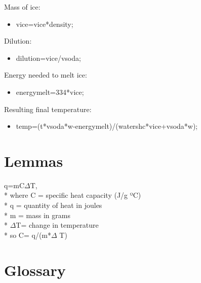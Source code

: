 \documentclass[oneside,12pt]{report}
\def\prefacesection#1{
\chapter*{#1}
\addcontentsline{toc}{chapter}{#1}
}
\begin{document}
\vspace{12pt}
Mass of ice: 
\begin{itemize}
 \item vice=vice*density;
\end{itemize}

\vspace{12pt}
Dilution:
\begin{itemize}
\item dilution=vice/vsoda;
\end{itemize}

\vspace{12pt}
Energy needed to melt ice:
\begin{itemize}
\item energymelt=334*vice;
\end{itemize}

\vspace{12pt}
Resulting final temperature:
\begin{itemize}
\item temp=(t*vsoda*w-energymelt)/(watershc*vice+vsoda*w);
\end{itemize}

%


%


%
%
%
%
%
%


\appendix
{}

\chapter{Lemmas}\label{Lemma}
\vspace{12pt} 

q=mC$\Delta$T,
\\*  where C = specific heat capacity (J/g ºC)
\\* q = quantity of heat in joules 
\\* m = mass in grams
\\* $\Delta$T= change in temperature
\\*  so C= q/(m*$\Delta$ T)

\chapter{Glossary}\label{Glossary}
\end{document}
